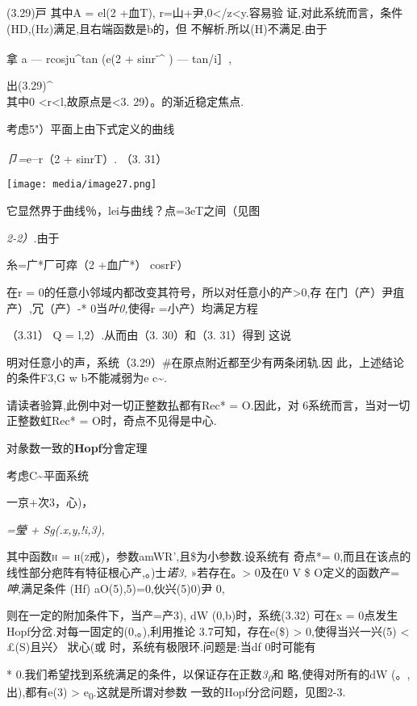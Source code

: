 \documentclass{article}
\begin{document}
(3.29)戸 其中A = el(2 +血T), r=山+尹,0\textless{}/z\textless{}y.容易验
证,对此系统而言，条件(HD,(Hz)满足,且右端函数是b的，但
不解析.所以(H)不满足.由于

拿 a --- rcosju\^{}tan (e(2 + sinr\textsuperscript{-}\^{} ) --- tan/i］,

出(3.29)\^{}\\
其中0 \textless{}r\textless{}l,故原点是\textless{}3.
29）。的渐近稳定焦点.

考虑5"）平面上由下式定义的曲线

\emph{卩=}e\textsuperscript{\_}r（2 + sinrT）. （3. 31）

\texttt{[image: media/image27.png]}

它显然界于曲线％，lei与曲线？点=3eT之间（见图

\emph{2-2）.}由于

糸=广*厂可瘁（2 +血广*） cosrF）

在r = 0的任意小邻域内都改变其符号，所以对任意小的产\textgreater{}0,存
在门（产）尹疽产）,冗（产）-* 0当\emph{叶0,}使得r =小产）均满足方程

（3.31） Q = l,2）.从而由（3. 30）和（3. 31）得到 这说

明对任意小的声，系统（3.29）\#在原点附近都至少有两条闭轨.因
此，上述结论的条件F3,G w b不能减弱为e c\textasciitilde{}.

请读者验算,此例中对一切正整数払都有Rec* = O.因此，对
6系统而言，当对一切正整数虹Rec* = O时，奇点不见得是中心.

对彖数一致的\textbf{Hopf}分會定理

考虑C\textasciitilde{}平面系统

一京+次3，心)，

\emph{=瑩 + Sg(.x,y,!i,3),}

其中函数\textsc{h = h(z}戒)，参数amWR',且\$为小参数.设系统有 奇点*=
0,而且在该点的线性部分疤阵有特征根心产,。)士\emph{诺3,}
»若存在。\textgreater{} 0及在0 V \$ O定义的函数产=\emph{呻},满足条件
(Hf) aO(5),5)=0,伙兴(5)0)尹 0,

则在一定的附加条件下，当产=产3), dW (0,b)时，系统(3.32) 可在x =
0点发生Hopf分岔.对每一固定的(0,。),利用推论 3.7可知，存在e(\$)
\textgreater{} 0,使得当\textbar{}兴一兴(5)\textbar{} \textless{}
£(S)且兴〉 狀心(或 时，系统有极限环.问题是:当df 0时可能有

*
0.我们希望找到系统满足的条件，以保证存在正数\emph{3\textsubscript{0}}和
略,使得对所有的dW (。,出),都有e(3) \textgreater{}
e\textsubscript{0}.这就是所谓对参数 一致的Hopf分岔问题，见图2-3.
\end{document}
